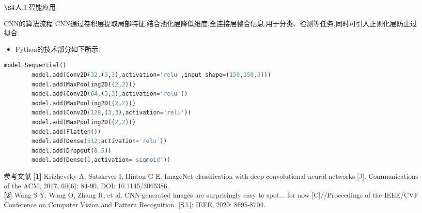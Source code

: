 \documentclass{beamer}
\begin{document}
\begin{frame}[fragile]{$\S4$人工智能应用}
    \begin{block}{CNN的算法流程}
        CNN通过卷积层提取局部特征,结合池化层降低维度,全连接层整合信息,用于分类、检测等任务,同时可引入正则化层防止过拟合.
    \end{block}
    \begin{itemize}
    \item Python的技术部分如下所示.
    \end{itemize}
    \begin{lstlisting}[language=Python, basicstyle=\ttfamily\tiny]
        model=Sequential()
        model.add(Conv2D(32,(3,3),activation='relu',input_shape=(150,150,3)))
        model.add(MaxPooling2D((2,2)))
        model.add(Conv2D(64,(3,3),activation='relu'))
        model.add(MaxPooling2D((2,2)))
        model.add(Conv2D(128,(3,3),activation='relu'))
        model.add(MaxPooling2D((2,2)))
        model.add(Flatten())
        model.add(Dense(512,activation='relu'))
        model.add(Dropout(0.5))
        model.add(Dense(1,activation='sigmoid'))
    \end{lstlisting}
\end{frame}

\begin{frame}{参考文献}
    \textbf{[1]} Krizhevsky A, Sutskever I, Hinton G E. ImageNet classification with deep convolutional neural networks [J]. Communications of the ACM, 2017, 60(6): 84-90. DOI: 10.1145/3065386.
    \\\textbf{[2]} Wang S Y, Wang O, Zhang R, et al. CNN-generated images are surprisingly easy to spot... for now [C]//Proceedings of the IEEE/CVF Conference on Computer Vision and Pattern Recognition. [S.l.]: IEEE, 2020: 8695-8704.
\end{frame}



\begin{frame}
    \titlepage
\end{frame}
\end{document}
